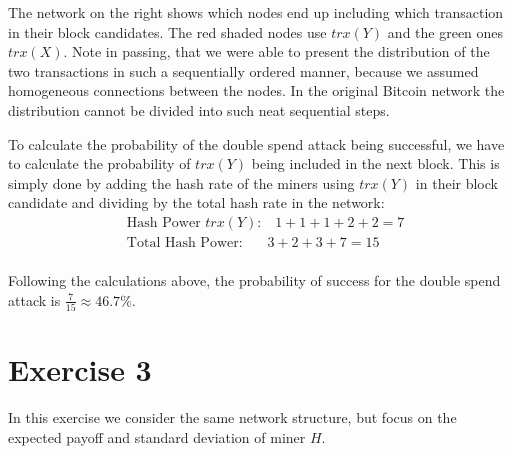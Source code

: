 \documentclass[12pt]{article}
\begin{document}
	The network on the right shows which nodes end up including which transaction in their block candidates. The red shaded nodes use $trx(Y)$ and the green ones $trx(X)$. Note in passing, that we were able to present the distribution of the two transactions in such a sequentially ordered manner, because we assumed homogeneous connections between the nodes. In the original Bitcoin network the distribution cannot be divided into such neat sequential steps.\par
	
	To calculate the probability of the double spend attack being successful, we have to calculate the probability of $trx(Y)$ being included in the next block. This is simply done by adding the hash rate of the miners using $trx(Y)$ in their block candidate and dividing by the total hash rate in the network:
	\begin{align*}
		&\text{Hash Power $trx(Y)$:}\quad 1+1+1+2+2=7\\
		&\text{Total Hash Power:}\quad \; \; \: 3+2+3+7=15\\
	\end{align*}
	
	\vspace{-0.9cm}
	Following the calculations above, the probability of success for the double spend attack is $\frac{7}{15} \approx 46.7\% $.
	
	\newpage
	
	\section*{Exercise 3}
	In this exercise we consider the same network structure, but focus on the expected payoff and standard deviation of miner $H$.
	
\end{document}
